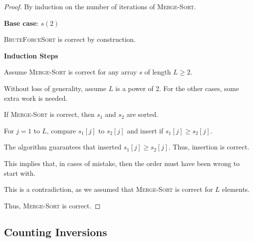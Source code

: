 \begin{proof}
    By induction on the number of iterations of \textsc{Merge-Sort}.

    \begin{listu}
        \item \textbf{Base case}: $s(2)$
        
        \textsc{BruteForceSort} is correct by construction.

        \item \textbf{Induction Steps}
        
        Assume \textsc{Merge-Sort} is correct for any array $s$ of length $L \ge 2$. 

        Without loss of generality, assume $L$ is a power of 2. For the other cases, some extra work is needed.
        
        \begin{center}
            \tikzexternalenable
            \tikzexternaldisable
        \end{center}

        If \textsc{Merge-Sort} is correct, then $s_1$ and $s_2$ are sorted.

        For $j = 1$ to $L$, compare $s_1[j]$ to $s_2[j]$ and insert if $s_1[j] \ge s_2[j]$.

        The algorithm guarantees that inserted $s_1[j] \ge s_2[j]$. Thus, insertion is correct.

        This implies that, in cases of mistake, then the order must have been wrong to start with. 

        This is a contradiction, as we assumed that \textsc{Merge-Sort} is correct for $L$ elements.
    \end{listu}

    Thus, \textsc{Merge-Sort} is correct. 
\end{proof}

\subsection{Counting Inversions}

